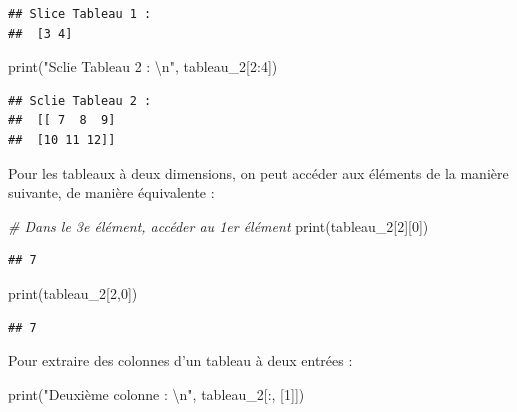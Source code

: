 \documentclass[12pt,]{book}
\newenvironment{Shaded}{\begin{snugshade}}{\end{snugshade}}
\newcommand{\DecValTok}[1]{\textcolor[rgb]{0.00,0.00,0.81}{#1}}
\newcommand{\CharTok}[1]{\textcolor[rgb]{0.31,0.60,0.02}{#1}}
\newcommand{\StringTok}[1]{\textcolor[rgb]{0.31,0.60,0.02}{#1}}
\newcommand{\CommentTok}[1]{\textcolor[rgb]{0.56,0.35,0.01}{\textit{#1}}}
\newcommand{\BuiltInTok}[1]{#1}
\newcommand{\NormalTok}[1]{#1}
\numberwithin{equation}{section}
\numberwithin{countremarque}{section}
\begin{document}
\begin{lstlisting}
## Slice Tableau 1 : 
##  [3 4]
\end{lstlisting}

\begin{Shaded}
\begin{Highlighting}[]
\BuiltInTok{print}\NormalTok{(}\StringTok{"Sclie Tableau 2 : }\CharTok{\textbackslash{}n}\StringTok{"}\NormalTok{, tableau_2[}\DecValTok{2}\NormalTok{:}\DecValTok{4}\NormalTok{])}
\end{Highlighting}
\end{Shaded}

\begin{lstlisting}
## Sclie Tableau 2 : 
##  [[ 7  8  9]
##  [10 11 12]]
\end{lstlisting}

Pour les tableaux à deux dimensions, on peut accéder aux éléments de la
manière suivante, de manière équivalente :

\begin{Shaded}
\begin{Highlighting}[]
\CommentTok{# Dans le 3e élément, accéder au 1er élément}
\BuiltInTok{print}\NormalTok{(tableau_2[}\DecValTok{2}\NormalTok{][}\DecValTok{0}\NormalTok{])}
\end{Highlighting}
\end{Shaded}

\begin{lstlisting}
## 7
\end{lstlisting}

\begin{Shaded}
\begin{Highlighting}[]
\BuiltInTok{print}\NormalTok{(tableau_2[}\DecValTok{2}\NormalTok{,}\DecValTok{0}\NormalTok{])}
\end{Highlighting}
\end{Shaded}

\begin{lstlisting}
## 7
\end{lstlisting}

Pour extraire des colonnes d'un tableau à deux entrées :

\begin{Shaded}
\begin{Highlighting}[]
\BuiltInTok{print}\NormalTok{(}\StringTok{"Deuxième colonne : }\CharTok{\textbackslash{}n}\StringTok{"}\NormalTok{, tableau_2[:, [}\DecValTok{1}\NormalTok{]])}
\end{Highlighting}
\end{Shaded}
\end{document}
